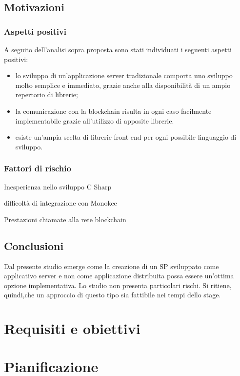 \subsection{Motivazioni}
\subsubsection{Aspetti positivi}
A seguito dell’analisi sopra proposta sono stati individuati i seguenti aspetti positivi:
\begin{itemize}
    \item lo sviluppo di un’applicazione server tradizionale comporta uno sviluppo molto semplice e immediato, grazie anche alla disponibilità di un ampio repertorio di librerie;
    \item la comunicazione con la blockchain risulta in ogni caso facilmente implementabile grazie all’utilizzo di apposite librerie.
    \item esiste un’ampia scelta di librerie front end per ogni possibile linguaggio di sviluppo.
\end{itemize}
    
\subsubsection{Fattori di rischio}
\begin{risk}{Inesperienza nello sviluppo C Sharp}
    \label{risk:centralization-vision-from-user} 
\end{risk}
\begin{risk}{difficoltà di integrazione con Monokee}
    \label{risk:centralization-vision-from-user} 
\end{risk}
\begin{risk}{Prestazioni chiamate alla rete blockchain}
    \label{risk:centralization-vision-from-user} 
\end{risk}
\subsection{Conclusioni}
Dal presente studio emerge come la creazione di un SP sviluppato come applicativo server e non come applicazione distribuita possa essere un’ottima opzione implementativa. Lo studio non presenta particolari rischi. Si ritiene, quindi,che un approccio di questo tipo sia fattibile nei tempi dello stage.

\section{Requisiti e obiettivi}

\section{Pianificazione}